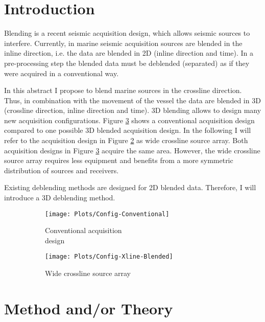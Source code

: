 \documentclass{madrid15WS}
\begin{document}
\section{Introduction}

Blending is a recent seismic acquisition design, which allows seismic sources to interfere. Currently, in marine seismic acquisition sources are blended in the inline direction, i.e. the data are blended in 2D (inline direction and time). In a pre-processing step the blended data must be deblended (separated) as if they were acquired in a conventional way. 

In this abstract I propose to blend marine sources in the crossline direction. Thus, in combination with the movement of the vessel the data are blended in 3D (crossline direction, inline direction and time). 3D blending allows to design many new acquisition configurations. Figure \ref{fig:Intro-Configs} shows a conventional acquisition design compared to one possible 3D blended acquisition design. In the following I will refer to the acquisition design in Figure \ref{fig:Intro-Config-Xline-Blended} as wide crossline source array. Both acquisition designs in Figure \ref{fig:Intro-Configs} acquire the same area. However, the wide crossline source array requires less equipment and benefits from a more symmetric distribution of sources and receivers.

Existing deblending methods are designed for 2D blended data. Therefore, I will introduce a 3D deblending method. 

\begin{figure}[h!]
	\centering
	\begin{subfigure}[t]{0.3\textwidth}
		\centering
		\texttt{[image: Plots/Config-Conventional]}
		\caption{Conventional acquisition \\design}
		\label{fig:Intro-Config-Conventional}
	\end{subfigure}
	\qquad \qquad 
	\centering
	\begin{subfigure}[t]{0.3\textwidth}
		\centering
		\texttt{[image: Plots/Config-Xline-Blended]}
		\caption{Wide crossline source array}
		\label{fig:Intro-Config-Xline-Blended}
	\end{subfigure}
	
	\caption{}
	\label{fig:Intro-Configs}
	
\end{figure}


\section{Method and/or Theory}
\end{document}
